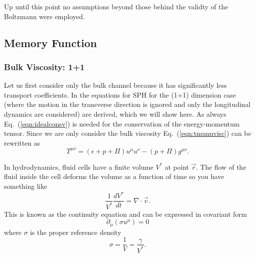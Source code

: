 \documentclass[aps,article]{revtex4}
\begin{document}
Up until this point no assumptions beyond those behind the validty of the Boltzmann were employed.  



\subsection{Memory Function}
\subsubsection{Bulk Viscosity: 1+1}

Let us first consider only the bulk channel because it has significantly less transport coefficients. In \cite{SPHrio} the equations for SPH for the (1+1) dimension case (where the motion in the transverse direction is ignored and only the longitudinal dynamics are considered) are derived, which we will show here.    As always Eq.\ (\ref{eqn:idealconsv}) is needed for the conservation of the energy-momentum tensor.  Since we are only consider the bulk viscosity Eq.\ (\ref{eqn:tmunuvisc}) can be rewritten as
\begin{equation}
T^{\mu\nu}=\left(\epsilon+p+\Pi\right)u^{\mu}u^{\nu}-\left(p+\Pi\right)g^{\mu\nu}.
\end{equation}

In hydrodynamics, fluid cells have a finite volume $V^*$ at point $\vec{r}$.  The flow of the fluid inside the cell deforms the volume as a function of time so you have something like
\begin{equation}\label{eqn:prevol}
\frac{1}{V^*}\frac{dV^*}{dt}=\nabla\cdot\vec{v}.  
\end{equation}
This is known as the continuity equation and can be expressed in covariant form
\begin{equation}\label{eqn:covform}
\partial_{\mu}\left(\sigma u^{\mu}\right)=0
\end{equation}
where $\sigma$ is the proper reference density 
\begin{equation}
\sigma=\frac{1}{V}=\frac{\gamma}{V^*}.
\end{equation}
\end{document}
